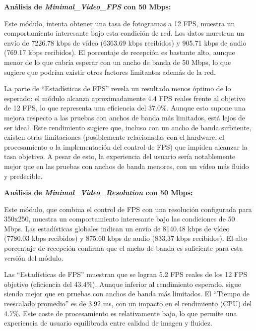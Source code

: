 \textbf{Análisis de \textit{Minimal\_Video\_FPS} con 50 Mbps:}
\vspace{\baselineskip}

Este módulo, intenta obtener una tasa de fotogramas a 12 FPS, muestra un comportamiento interesante bajo esta condición de red. Los datos muestran un envío de 7226.78 kbps de vídeo (6363.69 kbps recibidos) y 905.71 kbps de audio (769.17 kbps recibidos). El porcentaje de recepción es bastante alto, aunque menor de lo que cabría esperar con un ancho de banda de 50 Mbps, lo que sugiere que podrían existir otros factores limitantes además de la red.
\vspace{\baselineskip}

La parte de ``Estadísticas de FPS'' revela un resultado menos óptimo de lo esperado: el módulo alcanza aproximadamente 4.4 FPS reales frente al objetivo de 12 FPS, lo que representa una eficiencia del 37.0\%. Aunque esto supone una mejora respecto a las pruebas con anchos de banda más limitados, está lejos de ser ideal. Este rendimiento sugiere que, incluso con un ancho de banda suficiente, existen otras limitaciones (posiblemente relacionadas con el hardware, el procesamiento o la implementación del control de FPS) que impiden alcanzar la tasa objetivo. A pesar de esto, la experiencia del usuario sería notablemente mejor que en las pruebas con anchos de banda menores, con un vídeo más fluido y predecible.

\vspace{\baselineskip}

\textbf{Análisis de \textit{Minimal\_Video\_Resolution} con 50 Mbps:}
\vspace{\baselineskip}

Este módulo, que combina el control de FPS con una resolución configurada para 350x250, muestra un comportamiento interesante bajo las condiciones de 50 Mbps. Las estadísticas globales indican un envío de 8140.48 kbps de vídeo (7780.03 kbps recibidos) y 875.60 kbps de audio (833.37 kbps recibidos). El alto porcentaje de recepción confirma que el ancho de banda es suficiente para esta versión del módulo.

Las ``Estadísticas de FPS'' muestran que se logran 5.2 FPS reales de los 12 FPS objetivo (eficiencia del 43.4\%). Aunque inferior al rendimiento esperado, sigue siendo mejor que en pruebas con anchos de banda más limitados. El ``Tiempo de reescalado promedio'' es de 3.92 ms, con un impacto en el rendimiento (CPU) del 4.7\%. Este coste de procesamiento es relativamente bajo, lo que permite una experiencia de usuario equilibrada entre calidad de imagen y fluidez.
\vspace{\baselineskip}

